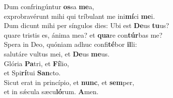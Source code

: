 \evenverse Dum confringúntur \textbf{os}sa \textbf{me}a,~\*\\
\evenverse exprobravérunt mihi qui tríbulant me ini\textbf{mí}ci \textbf{me}i.\\
\oddverse Dum dicunt mihi per síngulos dies: Ubi est \textbf{De}us \textbf{tu}us?~\*\\
\oddverse quare tristis es, ánima mea? et \textbf{qua}re con\textbf{túr}bas me?\\
\evenverse Spera in Deo, quóniam adhuc confi\textbf{té}bor \textbf{il}li:~\*\\
\evenverse salutáre vultus mei, et \textbf{De}us \textbf{me}us.\\
\oddverse Glória \textbf{Pa}tri, et \textbf{Fí}lio,~\*\\
\oddverse et Spi\textbf{rí}tui \textbf{San}cto.\\
\evenverse Sicut erat in princípio, et \textbf{nunc}, et \textbf{sem}per,~\*\\
\evenverse et in sǽcula sæcu\textbf{ló}rum. \textbf{A}men.\\
